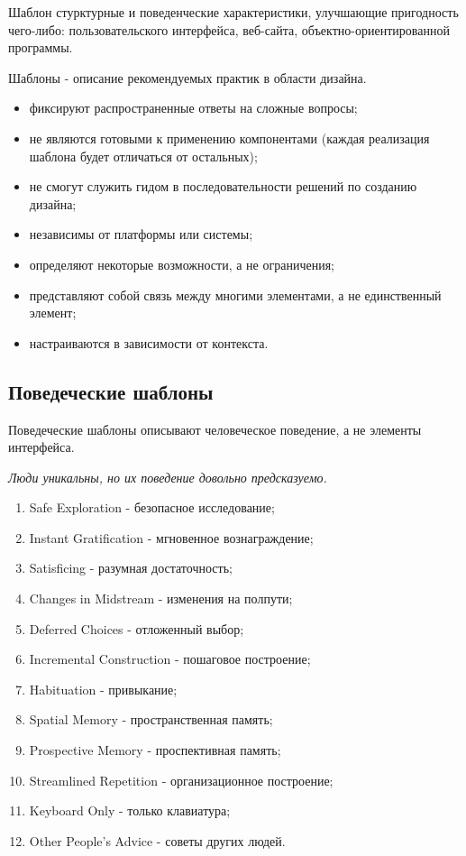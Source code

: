 \documentclass{beamer}
\begin{document}
\begin{frame}[t]
	\begin{block}{Шаблон}
		стурктурные и поведенческие характеристики, улучшающие пригодность чего-либо: пользовательского интерфейса, веб-сайта, объектно-ориентированной программы.
	\end{block}
	Шаблоны - описание рекомендуемых практик в области дизайна.
	\begin{itemize}
		\item фиксируют распространенные ответы на сложные вопросы;
		\item не являются готовыми к применению компонентами (каждая реализация шаблона будет отличаться от остальных);
		\item не смогут служить гидом в последовательности решений по созданию дизайна;
		\item независимы от платформы или системы;
		\item определяют некоторые возможности, а не ограничения;
		\item представляют собой связь между многими элементами, а не единственный элемент;
		\item настраиваются в зависимости от контекста.
	\end{itemize}	
\end{frame} 

\subsection{Поведеческие шаблоны}

\begin{frame}[t]	
	\begin{block}{Поведеческие шаблоны}
		описывают человеческое поведение, а не элементы интерфейса.
	\end{block}
	\textit{Люди уникальны, но их поведение довольно предсказуемо.}
	\begin{enumerate}
		\item Safe Exploration - безопасное исследование;
		\item Instant Gratification - мгновенное вознаграждение;
		\item Satisficing - разумная достаточность;
		\item Changes in Midstream - изменения на полпути;
		\item Deferred Choices - отложенный выбор;
		\item Incremental Construction - пошаговое построение;
		\item Habituation - привыкание;
		\item Spatial Memory - пространственная память;
		\item Prospective Memory - проспективная память;
		\item Streamlined Repetition - организационное построение;
		\item Keyboard Only - только клавиатура;
		\item Other People’s Advice - советы других людей.
	\end{enumerate}	
\end{frame} 
\end{document}
